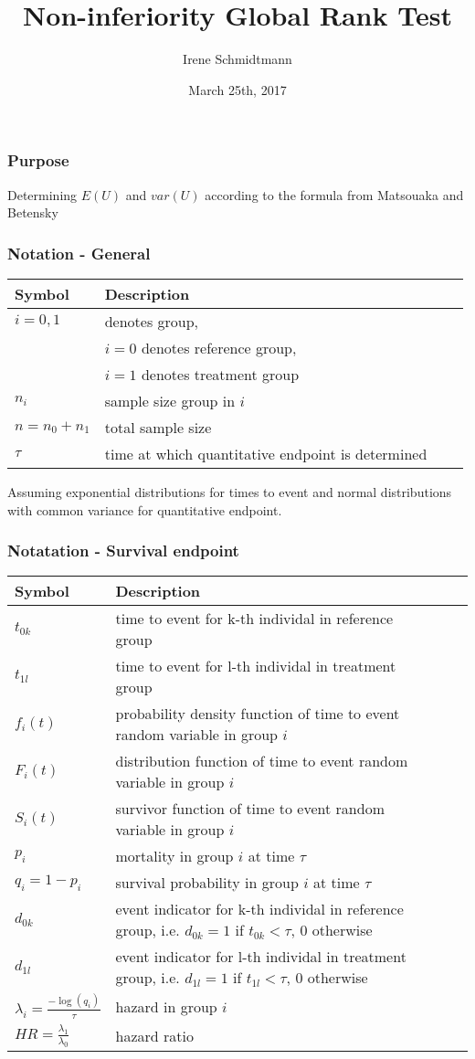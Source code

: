 \documentclass[xcolor=pdftex,dvipsnames,table]{beamer}
\title{Non-inferiority Global Rank Test} %
\author{Irene Schmidtmann}
\date{March 25th, 2017}
\begin{document}
\maketitle
\begin{frame} %
\frametitle{Purpose}
Determining $E(U)$ and $var(U)$ according to the formula from Matsouaka and Betensky
\end{frame}

\begin{frame} %
\frametitle{Notation - General}
%
\begin{tabular}{|lp{8cm}|lp{20cm}}\hline
Symbol               & Description \\
\hline
$i=0,1$              & denotes group, \\
                     & $i=0$ denotes reference group, \\
										 & $i=1$ denotes treatment group \\
$n_i$                & sample size group in $i$ \\
$n = n_0 + n_1$      & total sample size \\
$\tau$               & time at which quantitative endpoint is determined \\
\hline
\end{tabular}

Assuming exponential distributions for times to event and normal distributions with common variance for quantitative endpoint.

\end{frame}
%
\begin{frame} %
\frametitle{Notatation - Survival endpoint}
\begin{tabular}{|lp{8cm}|lp{20cm}}\hline
Symbol          & Description \\
\hline
$t_{0k}$        & time to event for k-th individal in reference group \\
$t_{1l}$        & time to event for l-th individal in treatment group \\
$f_{i}(t)$      & probability density function of time to event random variable in group $i$ \\
$F_{i}(t)$      & distribution function of time to event random variable in group $i$ \\
$S_{i}(t)$      & survivor function of time to event random variable in group $i$ \\
$p_i$           & mortality in group $i$ at time $\tau$ \\
$q_i= 1 - p_i$  & survival probability in group $i$ at time $\tau$ \\
$d_{0k}$        & event indicator for k-th individal in reference group, i.e. $d_{0k}=1$ if $t_{0k} < \tau$, 0 otherwise \\
$d_{1l}$        & event indicator for l-th individal in treatment group, i.e. $d_{1l}=1$ if $t_{1l} < \tau$, 0 otherwise \\
$\lambda_i=\frac{-\log(q_i)}{\tau}$       & hazard in group $i$ \\
$\mathit{HR}=\frac{\lambda_1}{\lambda_0}$ & hazard ratio \\
\hline

\end{tabular}
\end{frame}
\end{document}
